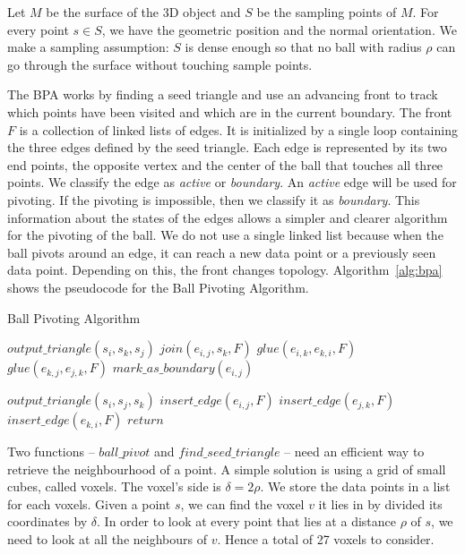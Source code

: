\documentclass[a4paper]{article}
\begin{document}
Let $M$ be the surface of the 3D object and $S$ be the sampling points of $M$. For every point $s \in S$, we have the geometric position and the normal orientation. We make a sampling assumption: $S$ is dense enough so that no ball with radius $\rho$ can go through the surface without touching sample points.


The BPA works by finding a seed triangle and use an advancing front to track which points have been visited and which are in the current boundary. The front $F$ is a collection of linked lists of edges. It is initialized by a single loop containing the three edges defined by the seed triangle. Each edge is represented by its two end points, the opposite vertex and the center of the ball that touches all three points. We classify the edge as \textit{active} or \textit{boundary}. An \textit{active} edge will be used for pivoting. If the pivoting is impossible, then we classify it as \textit{boundary}. This information about the states of the edges allows a simpler and clearer algorithm for the pivoting of the ball. We do not use a single linked list because when the ball pivots around an edge, it can reach a new data point or a previously seen data point. Depending on this, the front changes topology. Algorithm~\ref{alg:bpa} shows the pseudocode for the Ball Pivoting Algorithm.

\begin{algorithm}
\caption{Ball Pivoting Algorithm}
\label{alg:bpa}
\begin{algorithmic}[5]
      \State $output\_triangle(s_i, s_k, s_j)$
      \State $join(e_{i,j}, s_k, F)$
        \State $glue(e_{i,k}, e_{k,i}, F)$
      \EndIf
        \State $glue(e_{k,j}, e_{j,k}, F)$
      \EndIf
    \Else
      \State $mark\_as\_boundary(e_{i,j})$
    \EndIf
  \EndWhile

    \State $output\_triangle(s_i, s_j, s_k)$
    \State $insert\_edge(e_{i,j}, F)$
    \State $insert\_edge(e_{j,k}, F)$
    \State $insert\_edge(e_{k,i}, F)$
  \Else
    \State $return$
  \EndIf
\EndWhile
\end{algorithmic}
\end{algorithm} 

\newpage 
Two functions -- $ball\_pivot$ and $find\_seed\_triangle$ -- need an efficient way to retrieve the neighbourhood of a point. A simple solution is using a grid of small cubes, called voxels. The voxel's side is $\delta = 2\rho$. We store the data points in a list for each voxels. Given a point $s$, we can find the voxel $v$ it lies in by divided its coordinates by $\delta$. In order to look at every point that lies at a distance $\rho$ of $s$, we need to look at all the neighbours of $v$. Hence a total of 27 voxels to consider.
\end{document}
